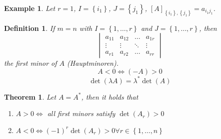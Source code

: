 \documentclass{article}
\newtheorem{theorem}{Theorem}  \numberwithin{theorem}{section}
\newtheorem{example}{Example}  \numberwithin{example}{section}
\newtheorem{definition}{Definition}  \numberwithin{definition}{section}
\newcommand{\set}[1]{\left\{#1\right\}}
\begin{document}
\begin{example}
  Let $r = 1$, $I = \set{i_1}$, $J = \set{j_1}$, $[A]_{\set{i_1}, \set{j_1}}  = a_{i_1 j_1}$.
\end{example}

\begin{definition}
  If $m=n$ with $I = \set{1, \ldots, r}$ and $J = \set{1, \ldots, r}$, then
  \[
    \begin{vmatrix}
      a_{11} & a_{12} & \ldots & a_{1r} \\
      \vdots & \vdots & \ddots & \vdots \\
      a_{r1} & a_{r2} & \ldots & a_{rr}
    \end{vmatrix}
  \]
  the first minor of $A$ (\foreignlanguage{german}{Hauptminoren}).
  \[ A < 0 \iff (-A) > 0 \]
  \[ \det(\lambda A) = \lambda^* \det(A) \]
\end{definition}

\begin{theorem} %
  Let $A = A^*$, then it holds that
  \begin{enumerate}
    \item $A > 0 \iff$ all first minors satisfy $\det(A_r) > 0$
    \item $A < 0 \iff (-1)^r \det(A_r) > 0 \forall r \in \set{1, \ldots, n}$
  \end{enumerate}
\end{theorem}
\end{document}
